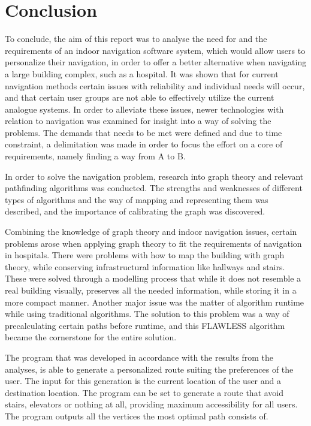 \chapter{Conclusion}

To conclude, the aim of this report was to analyse the need for and the requirements of an indoor navigation software system, which would allow users to personalize their navigation, in order to offer a better alternative when navigating a large building complex, such as a hospital. It was shown that for current navigation methods certain issues with reliability and individual needs will occur, and that certain user groups are not able to effectively utilize the current analogue systems. In order to alleviate these issues, newer technologies with relation to navigation was examined for insight into a way of solving the problems. The demands that needs to be met were defined and due to time constraint, a delimitation was made in order to focus the effort on a core of requirements, namely finding a way from A to B.

In order to solve the navigation problem, research into graph theory and relevant pathfinding algorithms was conducted. The strengths and weaknesses of different types of algorithms and the way of mapping and representing them was described, and the importance of calibrating the graph was discovered. 

Combining the knowledge of graph theory and indoor navigation issues, certain problems arose when applying graph theory to fit the requirements of navigation in hospitals. There were problems with how to map the building with graph theory, while conserving infrastructural information like hallways and stairs. These were solved through a modelling process that while it does not resemble a real building visually, preserves all the needed information, while storing it in a more compact manner. Another major issue was the matter of algorithm runtime while using traditional algorithms. The solution to this problem was a way of precalculating certain paths before runtime, and this FLAWLESS algorithm became the cornerstone for the entire solution.

The program that was developed in accordance with the results from the analyses, is able to generate a personalized route suiting the preferences of the user. The input for this generation is the current location of the user and a destination location. The program can be set to generate a route that avoid stairs, elevators or nothing at all, providing maximum accessibility for all users. The program outputs all the vertices the most optimal path consists of.